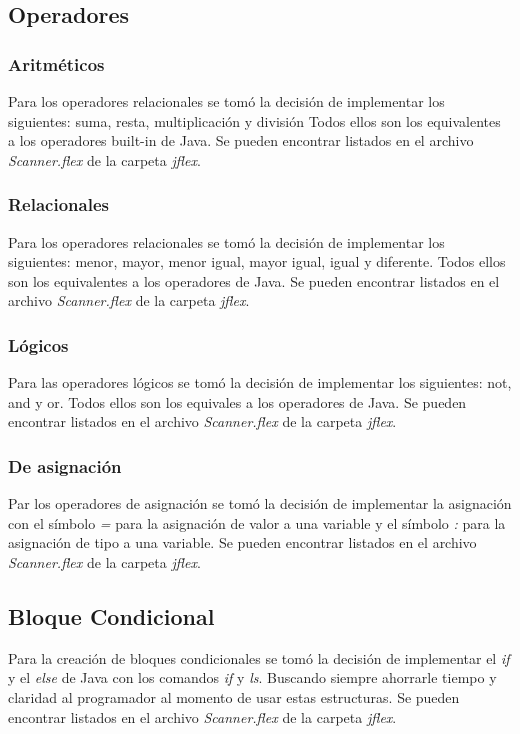 \documentclass{article}
\begin{document}
\subsection{Operadores}
\subsubsection{Aritméticos}
\par Para los operadores relacionales se tomó la decisión de implementar los siguientes: suma, resta, multiplicación y división Todos ellos son los equivalentes a los operadores built-in de Java. Se pueden encontrar listados en el archivo \textit{Scanner.flex} de la carpeta \textit{jflex}. 
\subsubsection{Relacionales}
\par Para los operadores relacionales se tomó la decisión de implementar los siguientes: menor, mayor, menor igual, mayor igual, igual y diferente. Todos ellos son los equivalentes a los operadores de Java. Se pueden encontrar listados en el archivo \textit{Scanner.flex} de la carpeta \textit{jflex}. 
\subsubsection{Lógicos}
\par Para las operadores lógicos se tomó la decisión de implementar los siguientes: not, and y or. Todos ellos son los equivales a los operadores de Java. Se pueden encontrar listados en el archivo \textit{Scanner.flex} de la carpeta \textit{jflex}.
\subsubsection{De asignación}
\par Par los operadores de asignación se tomó la decisión de implementar la asignación con el símbolo \textit{=} para la asignación de valor a una variable y el símbolo \textit{:} para la asignación de tipo a una variable. Se pueden encontrar listados en el archivo \textit{Scanner.flex} de la carpeta \textit{jflex}.
\subsection{Bloque Condicional}
\par Para la creación de bloques condicionales se tomó la decisión de implementar el \textit{if} y el \textit{else} de Java con los comandos \textit{if} y \textit{ls}. Buscando siempre ahorrarle tiempo y claridad al programador al momento de usar estas estructuras. Se pueden encontrar listados en el archivo \textit{Scanner.flex} de la carpeta \textit{jflex}.
\end{document}
